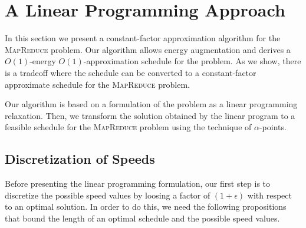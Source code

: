 \documentclass{llncs}
\newcommand{\mr}{\textsc{MapReduce}\xspace}
\begin{document}
\section{A Linear Programming Approach}\label{se:lpa}

In this section we present a constant-factor approximation algorithm for the \mr problem. Our algorithm allows energy augmentation and derives a $O(1)$-energy $O(1)$-approximation schedule for the problem. As we show, there is a tradeoff where the schedule can be converted to a constant-factor approximate schedule for the \mr problem.

Our algorithm is based on a formulation of the problem as a linear programming relaxation.
Then, we transform the solution obtained by the linear program to a feasible schedule for the \mr problem using the technique of $\alpha$-points.

\subsection{Discretization of Speeds}

Before presenting the linear programming formulation,
our first step is to discretize the possible speed values by loosing a factor of $(1+\epsilon)$ with respect to an optimal solution.
In order to do this, we need the following propositions that bound the length of an optimal schedule and the possible speed values.
\end{document}

